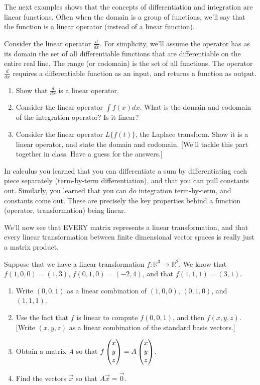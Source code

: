 The next examples shows that the concepts of differentiation and integration are linear functions.  Often when the domain is a group of functions, we'll say that the function is a linear operator (instead of a linear function).  
\begin{problem}
Consider the linear operator $\frac{d}{dx}$. For simplicity, we'll assume the operator has as its domain the set of all differentiable functions that are differentiable on the entire real line.  The range (or codomain) is the set of all functions.  The operator $\frac{d}{dx}$ requires a differentiable function as an input, and returns a function as output.
\begin{enumerate}
 \item Show that $\frac{d}{dx}$ is a linear operator.
 \item Consider the linear operator $\int f(x) dx$.  What is the domain and codomain of the integration operator? Is it linear?
 \item Consider the linear operator $L\{f(t)\}$, the Laplace transform. Show it is a linear operator, and state the domain and codomain. [We'll tackle this part together in class. Have a guess for the answers.]
\end{enumerate}

\end{problem}

In calculus you learned that you can differentiate a sum by differentiating each piece separately (term-by-term differentiation), and that you can pull constants out.  Similarly, you learned that you can do integration term-by-term, and constants come out.  These are precisely the key properties behind a function (operator, transformation) being linear.

We'll now see that EVERY matrix represents a linear transformation, and that every linear transformation between finite dimensional vector spaces is really just a matrix product.

\begin{problem}
 Suppose that we have a linear transformation $f:\mathbb{R}^3\to \mathbb{R}^2$. We know that $f(1,0,0) = (1,3)$, $f(0,1,0) = (-2,4)$, and that $f(1,1,1)=(3,1)$. 
\begin{enumerate}
 \item Write $(0,0,1)$ as a linear combination of $(1,0,0)$, $(0,1,0)$, and $(1,1,1)$. 
 \item Use the fact that $f$ is linear to compute $f(0,0,1)$, and then $f(x,y,z)$.  [Write $(x,y,z)$ as a linear combination of the standard basis vectors.]
 \item Obtain a matrix $A$ so that $f\begin{pmatrix} x\\y\\z \end{pmatrix} = A\begin{pmatrix} x\\y\\z \end{pmatrix}$.
 \item Find the vectors $\vec x$ so that $A\vec x = \vec 0$.
\end{enumerate}
    
\end{problem}

